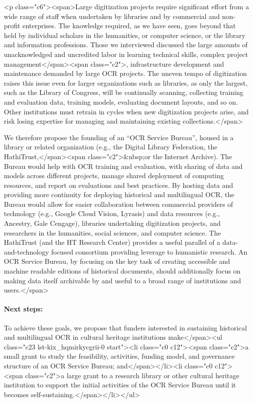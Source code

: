 \documentclass[twoside,11pt]{report}
\begin{document}
<p class="c6"><span>Large digitization projects require significant effort from a wide range of staff when undertaken by libraries and by commercial and non-profit enterprises. The knowledge required, as we have seen, goes beyond that held by individual scholars in the humanities, or computer science, or the library and information professions. Those we interviewed discussed the large amounts of unacknowledged and uncredited labor in learning technical skills, complex project management</span><span class="c2">, infrastructure development and maintenance demanded by large OCR projects. The uneven tempo of digitization raises this issue even for larger organizations such as libraries, as only the largest, such as the Library of Congress, will be continually scanning, collecting training and evaluation data, training models, evaluating document layouts, and so on. Other institutions must retrain in cycles when new digitization projects arise, and risk losing expertise for managing and maintaining existing collections.</span>

We therefore propose the founding of an ``OCR Service Bureau'', housed in a library or related organization (e.g., the Digital Library Federation, the HathiTrust,</span><span class="c2">&nbsp;or the Internet Archive). The Bureau would help with OCR training and evaluation, with sharing of data and models across different projects, manage shared deployment of computing resources, and report on evaluations and best practices. By hosting data and providing more continuity for deploying historical and multilingual OCR, the Bureau would allow for easier collaboration between commercial providers of technology (e.g., Google Cloud Vision, Lyrasis) and data resources (e.g., Ancestry, Gale Cengage), libraries undertaking digitization projects, and researchers in the humanities, social sciences, and computer science. The HathiTrust (and the HT Research Center) provides a useful parallel of a data-and-technology focused consortium providing leverage to humanistic research. An OCR Service Bureau, by focusing on the key task of creating accessible and machine readable editions of historical documents, should additionally focus on making data itself archivable by and useful to a broad range of institutions and users.</span>

\paragraph{Next steps:} To achieve these goals, we propose that funders interested in sustaining historical and multilingual OCR in cultural heritage institutions make</span><ul class="c23 lst-kix_hqmirkycgrii-0 start"><li class="c0 c12"><span class="c2">a small grant to study the feasibility, activities, funding model, and governance structure of an OCR Service Bureau; and</span></li><li class="c0 c12"><span class="c2">a large grant to a research library or other cultural heritage institution to support the initial activities of the OCR Service Bureau until it becomes self-sustaining.</span></li></ul>
\end{document}
